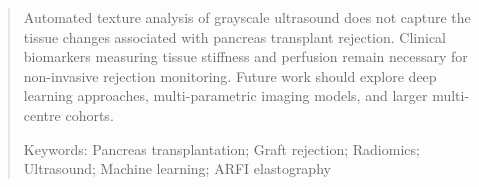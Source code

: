 \begin{abstract}
Automated texture analysis of grayscale ultrasound does not capture the tissue changes associated with pancreas transplant rejection. Clinical biomarkers measuring tissue stiffness and perfusion remain necessary for non-invasive rejection monitoring. Future work should explore deep learning approaches, multi-parametric imaging models, and larger multi-centre cohorts.

\bigskip
Keywords: Pancreas transplantation; Graft rejection; Radiomics; Ultrasound; Machine learning; ARFI elastography


\newpage
\end{abstract}
